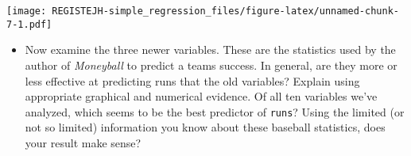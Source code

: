 \documentclass[
]{article}
\newenvironment{Shaded}{\begin{snugshade}}{\end{snugshade}}
\newcommand{\DataTypeTok}[1]{\textcolor[rgb]{0.13,0.29,0.53}{#1}}
\newcommand{\DecValTok}[1]{\textcolor[rgb]{0.00,0.00,0.81}{#1}}
\newcommand{\FloatTok}[1]{\textcolor[rgb]{0.00,0.00,0.81}{#1}}
\newcommand{\KeywordTok}[1]{\textcolor[rgb]{0.13,0.29,0.53}{\textbf{#1}}}
\newcommand{\NormalTok}[1]{#1}
\newcommand{\OperatorTok}[1]{\textcolor[rgb]{0.81,0.36,0.00}{\textbf{#1}}}
\newcommand{\StringTok}[1]{\textcolor[rgb]{0.31,0.60,0.02}{#1}}
\providecommand{\tightlist}{%
  \setlength{\itemsep}{0pt}\setlength{\parskip}{0pt}}
\begin{document}
\begin{Shaded}
\end{Shaded}

\texttt{[image: REGISTEJH-simple\_regression\_files/figure-latex/unnamed-chunk-7-1.pdf]}

\begin{itemize}
\tightlist
\item
  Now examine the three newer variables. These are the statistics used
  by the author of \emph{Moneyball} to predict a teams success. In
  general, are they more or less effective at predicting runs that the
  old variables? Explain using appropriate graphical and numerical
  evidence. Of all ten variables we've analyzed, which seems to be the
  best predictor of \texttt{runs}? Using the limited (or not so limited)
  information you know about these baseball statistics, does your result
  make sense?
\end{itemize}

\begin{Shaded}
\end{Shaded}
\end{document}
